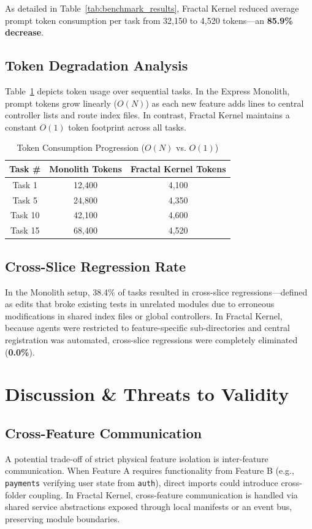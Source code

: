 \documentclass[conference]{IEEEtran}
\begin{document}
As detailed in Table~\ref{tab:benchmark_results}, Fractal Kernel reduced average prompt token consumption per task from 32,150 to 4,520 tokens---an \textbf{85.9\% decrease}.

\subsection{Token Degradation Analysis}
Table~\ref{tab:token_growth} depicts token usage over sequential tasks. In the Express Monolith, prompt tokens grow linearly ($O(N)$) as each new feature adds lines to central controller lists and route index files. In contrast, Fractal Kernel maintains a constant $O(1)$ token footprint across all tasks.

\begin{table}[htbp]
\caption{Token Consumption Progression ($O(N)$ vs. $O(1)$)}
\label{tab:token_growth}
\centering
\setlength{\tabcolsep}{4pt}
\footnotesize
\begin{tabular}{ccc}
\toprule
\textbf{Task \#} & \textbf{Monolith Tokens} & \textbf{Fractal Kernel Tokens} \\
\midrule
Task 1  & 12,400 & 4,100 \\
Task 5  & 24,800 & 4,350 \\
Task 10 & 42,100 & 4,600 \\
Task 15 & 68,400 & 4,520 \\
\bottomrule
\end{tabular}
\end{table}

\subsection{Cross-Slice Regression Rate}
In the Monolith setup, 38.4\% of tasks resulted in cross-slice regressions---defined as edits that broke existing tests in unrelated modules due to erroneous modifications in shared index files or global controllers. In Fractal Kernel, because agents were restricted to feature-specific sub-directories and central registration was automated, cross-slice regressions were completely eliminated (\textbf{0.0\%}).

\section{Discussion \& Threats to Validity}

\subsection{Cross-Feature Communication}
A potential trade-off of strict physical feature isolation is inter-feature communication. When Feature A requires functionality from Feature B (e.g., \texttt{payments} verifying user state from \texttt{auth}), direct imports could introduce cross-folder coupling. In Fractal Kernel, cross-feature communication is handled via shared service abstractions exposed through local manifests or an event bus, preserving module boundaries.
\end{document}
